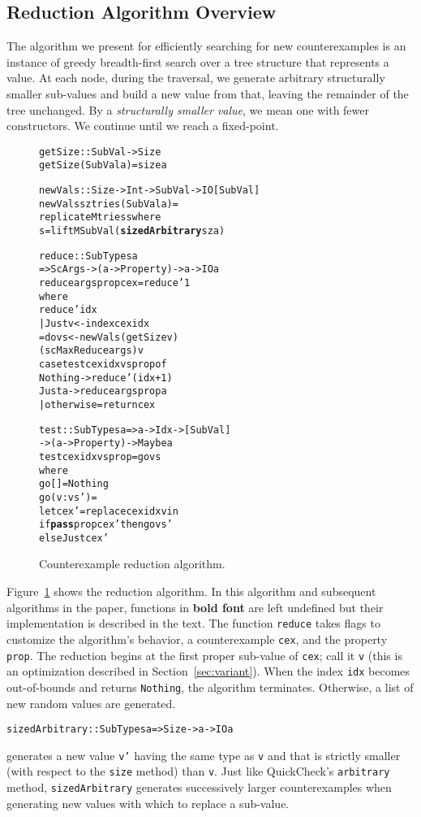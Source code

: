 \documentclass{sigplanconf}
\newenvironment{code}{\begin{alltt}\footnotesize}{\end{alltt}}
\newcommand{\ttp}[1]{\texttt{#1}}
\newcommand{\undef}[1]{{\bf #1}}
\begin{document}
\subsection{Reduction Algorithm Overview}\label{sec:reduct}
The algorithm we present for efficiently searching for new counterexamples is an
instance of greedy breadth-first search over a tree structure that represents a
value.  At each node, during the traversal, we generate arbitrary
structurally smaller sub-values and build a new value from that, leaving
the remainder of the tree unchanged.  By a \emph{structurally
  smaller value}, we mean one with fewer constructors.  We continue until we
reach a fixed-point.


\begin{figure}[ht]
  \begin{code}
getSize :: SubVal -> Size
getSize (SubVal a) = size a

newVals :: Size -> Int -> SubVal -> IO [SubVal]
newVals sz tries (SubVal a) =
  replicateM tries s where
  s = liftM SubVal (\undef{sizedArbitrary} sz a)

reduce :: SubTypes a
  => ScArgs -> (a -> Property) -> a -> IO a
reduce args prop cex = reduce' 1
  where
  reduce' idx
    | Just v <- index cex idx
    = do vs <- newVals (getSize v)
                 (scMaxReduce args) v
         case test cex idx vs prop of
           Nothing -> reduce' (idx+1)
           Just a  -> reduce args prop a
    | otherwise = return cex

test :: SubTypes a => a -> Idx -> [SubVal]
     -> (a -> Property) -> Maybe a
test cex idx vs prop = go vs
  where
  go []      = Nothing
  go (v:vs') =
    let cex' = replace cex idx v in
    if \undef{pass} prop cex' then go vs'
      else Just cex'
  \end{code}
  \caption{Counterexample reduction algorithm.\label{fig:reduction}}
\end{figure}

Figure~\ref{fig:reduction} shows the reduction algorithm.  In this algorithm and
subsequent algorithms in the paper, functions in {\bf bold font} are left
undefined but their implementation is described in the text.  The function
\ttp{reduce} takes flags to customize the algorithm's behavior, a counterexample
\ttp{cex}, and the property \ttp{prop}.  The reduction begins at the first
proper sub-value of \ttp{cex}; call it \ttp{v} (this is an optimization
described in Section~\ref{sec:variant}).  When the index \ttp{idx} becomes
out-of-bounds and returns \ttp{Nothing}, the algorithm terminates.  Otherwise, a
list of new random values are generated.
%
\begin{code}
sizedArbitrary :: SubTypes a => Size -> a -> IO a
\end{code}
%
\noindent
generates a new value \ttp{v'} having the same type as \ttp{v} and that is
strictly smaller (with respect to the \ttp{size} method) than \ttp{v}.  Just
like QuickCheck's \ttp{arbitrary} method, \ttp{sizedArbitrary} generates
successively larger counterexamples when generating new values with which to
replace a sub-value.
\end{document}
